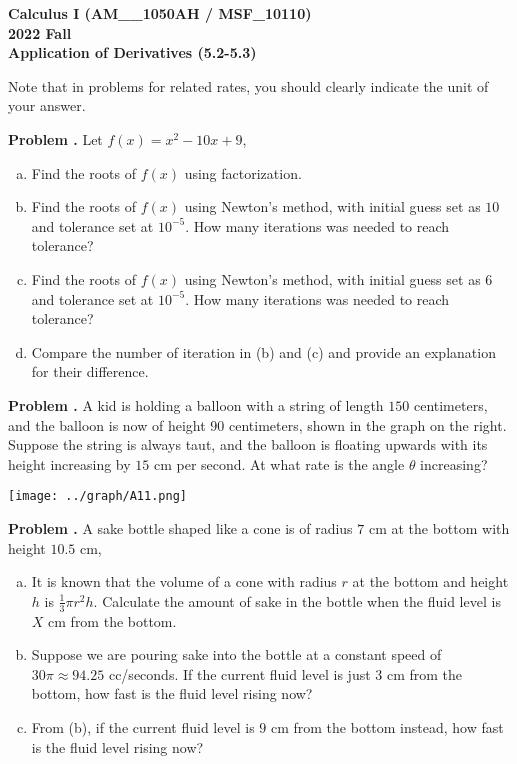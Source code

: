 \documentclass[11pt,letterpaper]{article}
\newcounter{problem}
\newcommand{\problem}{
	\stepcounter{problem}%
	\noindent \textbf{Problem \theproblem. }%
}
\begin{document}
\noindent\textbf{\large Calculus I (AM\_\_1050AH / MSF\_10110) \\ 2022 Fall \\ Application of Derivatives (5.2-5.3)}

\bigskip

\noindent Note that in problems for related rates, you should clearly indicate the unit of your answer. 

\bigskip

\problem Let $f(x) = x^2 - 10x + 9$,
\begin{enumerate}[(a)]
    \item Find the roots of $f(x)$ using factorization.
    \item Find the roots of $f(x)$ using Newton's method, with initial guess set as $10$ and tolerance set at $10^{-5}$.  How many iterations was needed to reach tolerance?
    \item Find the roots of $f(x)$ using Newton's method, with initial guess set as $6$ and tolerance set at $10^{-5}$.  How many iterations was needed to reach tolerance?
    \item Compare the number of iteration in (b) and (c) and provide an explanation for their difference.
\end{enumerate}\vspace{6mm}


\noindent\begin{minipage}{0.7\textwidth}
    \problem A kid is holding a balloon with a string of length $150$ centimeters, and the balloon is now of height $90$ centimeters, shown in the graph on the right. Suppose the string is always taut, and the balloon is floating upwards with its height increasing by $15$ cm per second.  At what rate is the angle $\theta$ increasing?
\end{minipage}
\begin{minipage}{0.3\textwidth}
    \begin{center}
        \texttt{[image: ../graph/A11.png]}
    \end{center}
\end{minipage}
\vspace{6mm}

\problem A sake bottle shaped like a cone is of radius $7$ cm at the bottom with height $10.5$ cm,
\begin{enumerate}[(a)]
    \item It is known that the volume of a cone with radius $r$ at the bottom and height $h$ is $\frac{1}{3}\pi r^2 h$.  Calculate the amount of sake in the bottle when the fluid level is $X$ cm from the bottom.
    \item Suppose we are pouring sake into the bottle at a constant speed of $30 \pi \approx 94.25$ cc/seconds.  If the current fluid level is just $3$ cm from the bottom, how fast is the fluid level rising now?
    \item From (b), if the current fluid level is $9$ cm from the bottom instead, how fast is the fluid level rising now?
\end{enumerate}\vspace{6mm}
\end{document}
